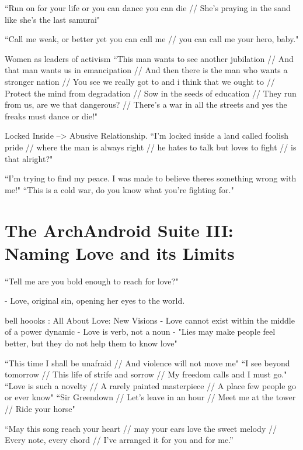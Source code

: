 \documentclass[a4paper, 11pt]{article} %
\begin{document}
``Run on for your life or you can dance you can die // She's praying in the sand like she's the last samurai"\cite{danceordie}

``Call me weak, or better yet you can call me // you can call me your hero, baby."\cite{faster}

Women as leaders of activism
``This man wants to see another jubilation //
And that man wants us in emancipation //
And then there is the man who wants a stronger nation //
You see we really got to and i think that we ought to //
Protect the mind from degradation //
Sow in the seeds of education //
They run from us, are we that dangerous? //
There's a war in all the streets and yes the freaks must dance or die!"\cite{danceordie}

Locked Inside --> Abusive Relationship.
``I'm locked inside a land called foolish pride // where the man is always right // he hates to talk but loves to fight // is that alright?"\cite{lockedinside}

``I'm trying to find my peace.  I was made to believe theres something wrong with me!"\cite{coldwar}
``This is a cold war, do you know what you're fighting for."\cite{coldwar}




\section*{The ArchAndroid Suite III: Naming Love and its Limits}

``Tell me are you bold enough to reach for love?"\cite{manymoons}

- Love, original sin, opening her eyes to the world.

bell hoooks : All About Love: New Visions
- Love cannot exist within the middle of a power dynamic
- Love is verb, not a noun
- "Lies may make people feel better, but they do not help them to know love" 

``This time I shall be unafraid // And violence will not move me"\cite{babopbyeya}
``I see beyond tomorrow // This life of strife and sorrow // My freedom calls and I must go."\cite{babopbyeya}
``Love is such a novelty // A rarely painted masterpiece // A place few people go or ever know"\cite{sayyouwillgo}
``Sir Greendown // Let's leave in an hour // Meet me at the tower // Ride your horse"\cite{greendown}

``May this song reach your heart // may your ears love the sweet melody // Every note, every chord // I've arranged it for you and for me.''\cite{neonvalleystreet}
\end{document}
